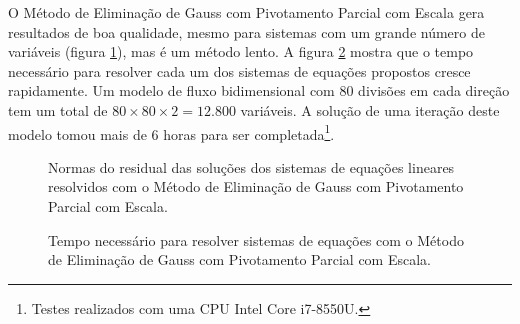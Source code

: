 \documentclass[final,5p]{elsarticle}
\numberwithin{equation}{section}
\begin{document}
        O Método de Eliminação de Gauss com Pivotamento Parcial com Escala gera resultados de boa qualidade, mesmo para sistemas com um grande número de variáveis (figura \ref{fig:errodois}), mas é um método lento. A figura \ref{fig:tempo} mostra que o tempo necessário para resolver cada um dos sistemas de equações propostos cresce rapidamente. Um modelo de fluxo bidimensional com 80 divisões em cada direção tem um total de $80 \times 80 \times 2 = 12.800$ variáveis. A solução de uma iteração deste modelo tomou mais de 6 horas para ser completada\footnote{Testes realizados com uma CPU Intel Core i7-8550U.}.

        \begin{figure}[hbt!]
            \caption{Normas do residual das soluções dos sistemas de equações lineares resolvidos com o Método de Eliminação de Gauss com Pivotamento Parcial com Escala.}
            \label{fig:errodois}
        \end{figure}

        \begin{figure}[hbt!]
            \caption{Tempo necessário para resolver sistemas de equações com o Método de Eliminação de Gauss com Pivotamento Parcial com Escala.}
            \label{fig:tempo}
        \end{figure}
\end{document}
